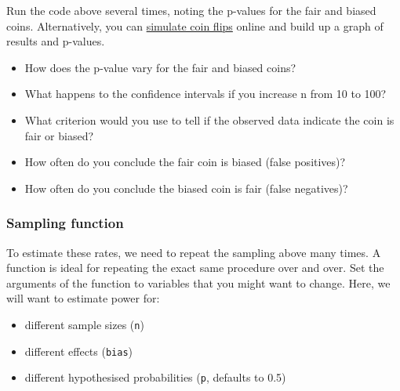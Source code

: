 \documentclass[
  oneside]{book}
\newenvironment{Shaded}{\begin{snugshade}}{\end{snugshade}}
\newcommand{\AttributeTok}[1]{\textcolor[rgb]{0.77,0.63,0.00}{#1}}
\newcommand{\CommentTok}[1]{\textcolor[rgb]{0.56,0.35,0.01}{\textit{#1}}}
\newcommand{\ControlFlowTok}[1]{\textcolor[rgb]{0.13,0.29,0.53}{\textbf{#1}}}
\newcommand{\DecValTok}[1]{\textcolor[rgb]{0.00,0.00,0.81}{#1}}
\newcommand{\FloatTok}[1]{\textcolor[rgb]{0.00,0.00,0.81}{#1}}
\newcommand{\FunctionTok}[1]{\textcolor[rgb]{0.00,0.00,0.00}{#1}}
\newcommand{\NormalTok}[1]{#1}
\newcommand{\OtherTok}[1]{\textcolor[rgb]{0.56,0.35,0.01}{#1}}
\newcommand{\SpecialCharTok}[1]{\textcolor[rgb]{0.00,0.00,0.00}{#1}}
\providecommand{\tightlist}{%
  \setlength{\itemsep}{0pt}\setlength{\parskip}{0pt}}
\begin{document}
\begin{info}

Run the code above several times, noting the p-values for the fair and biased coins. Alternatively, you can \href{http://shiny.psy.gla.ac.uk/debruine/coinsim/}{simulate coin flips} online and build up a graph of results and p-values.

\begin{itemize}
\tightlist
\item
  How does the p-value vary for the fair and biased coins?
\item
  What happens to the confidence intervals if you increase n from 10 to 100?
\item
  What criterion would you use to tell if the observed data indicate the coin is fair or biased?
\item
  How often do you conclude the fair coin is biased (false positives)?
\item
  How often do you conclude the biased coin is fair (false negatives)?
\end{itemize}

\end{info}

\hypertarget{sampling-binom}{%
\subsubsection{Sampling function}\label{sampling-binom}}

To estimate these rates, we need to repeat the sampling above many times. A function is ideal for repeating the exact same procedure over and over. Set the arguments of the function to variables that you might want to change. Here, we will want to estimate power for:

\begin{itemize}
\tightlist
\item
  different sample sizes (\texttt{n})
\item
  different effects (\texttt{bias})
\item
  different hypothesised probabilities (\texttt{p}, defaults to 0.5)
\end{itemize}

\begin{Shaded}
\end{Shaded}
\end{document}

